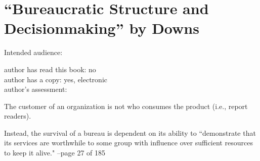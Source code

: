 \section{``Bureaucratic Structure and Decisionmaking'' by Downs}

\cite{1966_Downs}

Intended audience:

author has read this book: no\\
author has a copy: yes, electronic\\
author's assessment:

The customer of an organization is not who consumes the product (i.e., report readers).

Instead, the survival of a bureau is dependent on its ability to ``demonstrate that its services are worthwhile to some group with influence over sufficient resources to keep it alive."
--page 27 of 185